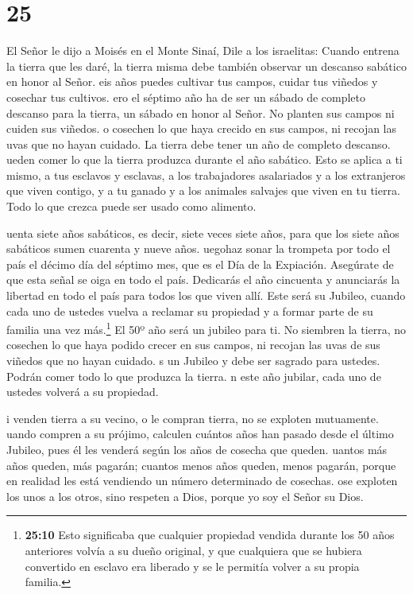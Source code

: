 \hypertarget{section-24}{%
\section{25}\label{section-24}}

 El Señor le dijo a Moisés en el Monte Sinaí, 
Dile a los israelitas: Cuando entrena la tierra que les daré, la tierra
misma debe también observar un descanso sabático en honor al Señor.
 eis años puedes cultivar tus campos, cuidar tus viñedos y
cosechar tus cultivos.  ero el séptimo año ha de ser un
sábado de completo descanso para la tierra, un sábado en honor al Señor.
No planten sus campos ni cuiden sus viñedos.  o cosechen lo
que haya crecido en sus campos, ni recojan las uvas que no hayan
cuidado. La tierra debe tener un año de completo descanso. 
ueden comer lo que la tierra produzca durante el año sabático. Esto se
aplica a ti mismo, a tus esclavos y esclavas, a los trabajadores
asalariados y a los extranjeros que viven contigo,  y a tu
ganado y a los animales salvajes que viven en tu tierra. Todo lo que
crezca puede ser usado como alimento.

 uenta siete años sabáticos, es decir, siete veces siete
años, para que los siete años sabáticos sumen cuarenta y nueve años.
 uegohaz sonar la trompeta por todo el país el décimo día
del séptimo mes, que es el Día de la Expiación. Asegúrate de que esta
señal se oiga en todo el país.  Dedicarás el año cincuenta
y anunciarás la libertad en todo el país para todos los que viven allí.
Este será su Jubileo, cuando cada uno de ustedes vuelva a reclamar su
propiedad y a formar parte de su familia una vez más.\footnote{\textbf{25:10}
  Esto significaba que cualquier propiedad vendida durante los 50 años
  anteriores volvía a su dueño original, y que cualquiera que se hubiera
  convertido en esclavo era liberado y se le permitía volver a su propia
  familia.}  El 50º año será un jubileo para ti. No
siembren la tierra, no cosechen lo que haya podido crecer en sus campos,
ni recojan las uvas de sus viñedos que no hayan cuidado.  s
un Jubileo y debe ser sagrado para ustedes. Podrán comer todo lo que
produzca la tierra.  n este año jubilar, cada uno de
ustedes volverá a su propiedad.

 i venden tierra a su vecino, o le compran tierra, no se
exploten mutuamente.  uando compren a su prójimo, calculen
cuántos años han pasado desde el último Jubileo, pues él les venderá
según los años de cosecha que queden.  uantos más años
queden, más pagarán; cuantos menos años queden, menos pagarán, porque en
realidad les está vendiendo un número determinado de cosechas.
 ose exploten los unos a los otros, sino respeten a Dios,
porque yo soy el Señor su Dios.

